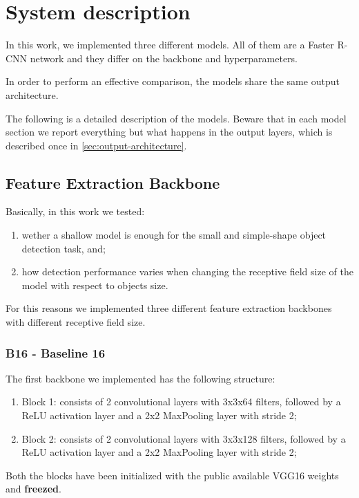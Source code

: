 \documentclass[a4paper,10pt]{report}
\begin{document}
\chapter{System description}\label{chap:system-description}

In this work, we implemented three different models. All of them are a Faster R-CNN network and they differ on the backbone and hyperparameters.

In order to perform an effective comparison, the models share the same output architecture.

The following is a detailed description of the models. Beware that in each model section we report everything but what happens in the output layers, which is described once in \ref{sec:output-architecture}.

\section{Feature Extraction Backbone}\label{sec:feature-extraction-backbone}
Basically, in this work we tested:
\begin{enumerate}
\item wether a shallow model is enough for the small and simple-shape object detection task, and;
\item how detection performance varies when changing the receptive field size of the model with respect to objects size.
\end{enumerate}

For this reasons we implemented three different feature extraction backbones with different receptive field size.

\subsection{B16 - Baseline 16}\label{subsec:b16}

The first backbone we implemented has the following structure:
\begin{enumerate}
  \item Block 1: consists of 2 convolutional layers with 3x3x64 filters, followed by a ReLU activation layer and a 2x2 MaxPooling layer with stride 2;
  \item Block 2: consists of 2 convolutional layers with 3x3x128 filters, followed by a ReLU activation layer and a 2x2 MaxPooling layer with stride 2;
\end{enumerate}
Both the blocks have been initialized with the public available VGG16 weights and \textbf{freezed}.
\end{document}
